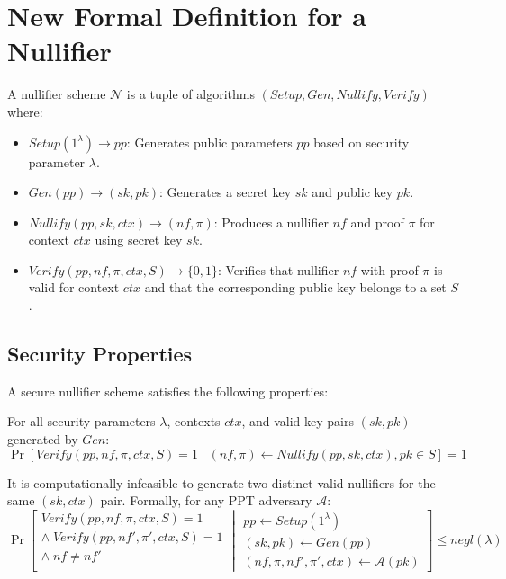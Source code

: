 
\section{New Formal Definition for a Nullifier}

\begin{definition}
A nullifier scheme $\mathcal{N}$ is a tuple of algorithms $(Setup, Gen, Nullify, Verify)$ where:

\begin{itemize}
    \item $Setup(1^\lambda) \rightarrow pp$: Generates public parameters $pp$ based on security parameter $\lambda$.
    
    \item $Gen(pp) \rightarrow (sk, pk)$: Generates a secret key $sk$ and public key $pk$.
    
    \item $Nullify(pp, sk, ctx) \rightarrow (nf, \pi)$: Produces a nullifier $nf$ and proof $\pi$ for context $ctx$ using secret key $sk$.
    
    \item $Verify(pp, nf, \pi, ctx, S) \rightarrow \{0,1\}$: Verifies that nullifier $nf$ with proof $\pi$ is valid for context $ctx$ and that the corresponding public key belongs to a set $S$.
\end{itemize}
\end{definition}

\subsection{Security Properties}

A secure nullifier scheme satisfies the following properties:

\begin{property}[Correctness]
For all security parameters $\lambda$, contexts $ctx$, and valid key pairs $(sk, pk)$ generated by $Gen$:
$$\Pr[Verify(pp, nf, \pi, ctx, S) = 1 \mid (nf, \pi) \leftarrow Nullify(pp, sk, ctx), pk \in S] = 1$$
\end{property}

\begin{property}[Uniqueness]
It is computationally infeasible to generate two distinct valid nullifiers for the same $(sk, ctx)$ pair. Formally, for any PPT adversary $\mathcal{A}$:
$$\Pr\left[\begin{array}{c}
Verify(pp, nf, \pi, ctx, S) = 1 \\
\land\; Verify(pp, nf', \pi', ctx, S) = 1 \\
\land\; nf \neq nf' \\
\end{array}
\middle|
\begin{array}{c}
pp \leftarrow Setup(1^\lambda) \\
(sk, pk) \leftarrow Gen(pp) \\
(nf, \pi, nf', \pi', ctx) \leftarrow \mathcal{A}(pk)
\end{array}
\right] \leq negl(\lambda)$$
\end{property}


